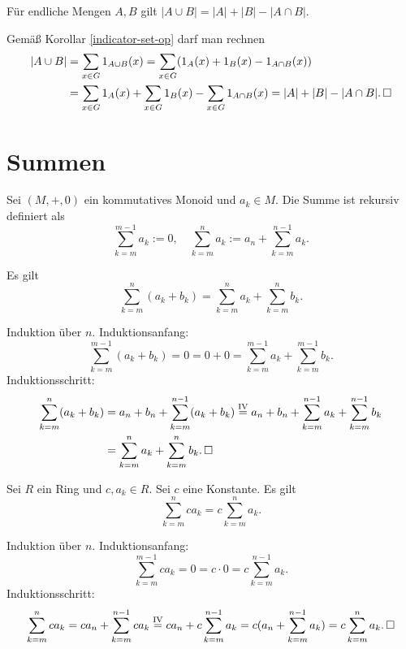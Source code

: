 \begin{Satz}
Für endliche Mengen $A,B$ gilt $|A\cup B| = |A|+|B|-|A\cap B|$.
\end{Satz}
\begin{Beweis}
Gemäß Korollar \ref{indicator-set-op} darf man rechnen
\begin{align*}
|A\cup B| &= \sum_{x\in G} 1_{A\cup B}(x)
= \sum_{x\in G} (1_A(x) + 1_B(x) - 1_{A\cap B}(x))\\
&= \sum_{x\in G} 1_A(x) + \sum_{x\in G} 1_B(x) - \sum_{x\in G} 1_{A\cap B}(x)
= |A| + |B| - |A\cap B|.\,\square
\end{align*}
\end{Beweis}

\newpage
\section{Summen}

\begin{Definition}[Summe]
Sei $(M,+,0)$ ein kommutatives Monoid und $a_k\in M$. Die Summe ist
rekursiv definiert als
\[\sum_{k=m}^{m-1} a_k := 0,\quad \sum_{k=m}^n a_k
:= a_n + \sum_{k=m}^{n-1} a_k.\]
\end{Definition}

\begin{Korollar} Es gilt
\[\sum_{k=m}^n (a_k + b_k) = \sum_{k=m}^n a_k + \sum_{k=m}^n b_k.\]
\end{Korollar}
\begin{Beweis} Induktion über $n$.
Induktionsanfang:
\[\sum_{k=m}^{m-1} (a_k + b_k) = 0 = 0 + 0 = \sum_{k=m}^{m-1} a_k + \sum_{k=m}^{m-1} b_k.\]
Induktionsschritt:
\begin{align*}
\sum_{k=m}^n (a_k+b_k) &= a_n + b_n + \sum_{k=m}^{n-1} (a_k+b_k)
\stackrel{\mathrm{IV}}= a_n + b_n + \sum_{k=m}^{n-1} a_k + \sum_{k=m}^{n-1} b_k\\
&= \sum_{k=m}^n a_k + \sum_{k=m}^n b_k.\,\square
\end{align*}
\end{Beweis}

\begin{Korollar} Sei $R$ ein Ring und $c,a_k\in R$. Sei $c$ eine
Konstante. Es gilt
\[\sum_{k=m}^n ca_k = c\sum_{k=m}^n a_k.\]
\end{Korollar}
\begin{Beweis} Induktion über $n$. Induktionsanfang:
\[\sum_{k=m}^{m-1} ca_k = 0 = c\cdot 0 = c\sum_{k=m}^{n-1} a_k.\]
Induktionsschritt:
\[\sum_{k=m}^n ca_k = ca_n + \sum_{k=m}^{n-1} ca_k
\stackrel{\mathrm{IV}}= ca_n + c\sum_{k=m}^{n-1} a_k
= c(a_n + \sum_{k=m}^{n-1} a_k) = c\sum_{k=m}^n a_k.\,\square\]
\end{Beweis}

